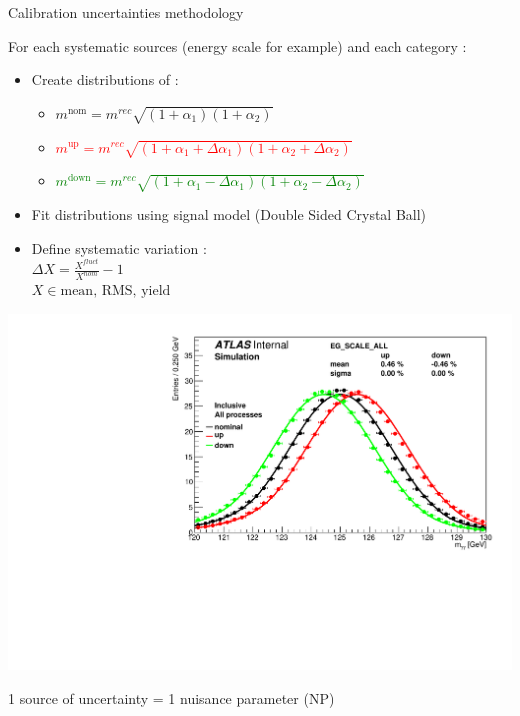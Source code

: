 \begin{frame}{Calibration uncertainties methodology}

      For each systematic sources (energy scale for example) and each category : 
      \begin{itemize}
      \item Create distributions of :
        \begin{itemize}
        \item $m^\text{nom} = m^{rec}\sqrt{(1+\alpha_1)(1+\alpha_2)}$
        \item \textcolor{red}{$m^\text{up} = m^{rec}\sqrt{(1+\alpha_1 + \Delta\alpha_1)(1+\alpha_2+\Delta\alpha_2)}$}
        \item \textcolor{green}{$m^\text{down} = m^{rec}\sqrt{(1+\alpha_1 - \Delta\alpha_1)(1+\alpha_2-\Delta\alpha_2)} $}
        \end{itemize}

      \end{itemize}

  \begin{minipage}{0.49\linewidth}
    \begin{itemize}
            \item Fit distributions using signal model (Double Sided Crystal Ball)
    \item Define systematic variation : \\$\Delta X = \frac{X^{fluct}}{X^{nom}}-1$ \\ $X\in {\text{mean, RMS, yield}}$
    \end{itemize}
    \end{minipage}
    \hfill
    \begin{minipage}{0.49\linewidth}
      \includegraphics[width=\linewidth]{Figures/h013_EG_SCALE_ALL_0.pdf}
    \end{minipage}
    \vfill
      1 source of uncertainty = 1 nuisance parameter (NP)
\end{frame}

